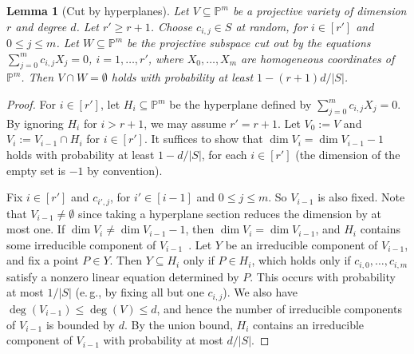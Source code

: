 \documentclass[11pt]{article}
\numberwithin{equation}{section}
\newtheorem{lemma}[theorem]{Lemma}
\theoremstyle{definition}
\theoremstyle{plain}
\newcommand{\eg}{e.\,g.}
\newcommand{\proj}{\mathbb{P}}
\begin{document}
\begin{lemma}[Cut by hyperplanes]\label{lem_hyperplane}
Let $V\subseteq\proj^m$ be a projective variety of dimension $r$ and degree $d$. Let $r'\geq r+1$. Choose $c_{i,j}\in S$ at random, for $i\in [r']$ and $0\leq j\leq m$.
Let $W\subseteq \proj^m$ be the projective subspace cut out by the equations $\sum_{j=0}^{m} c_{i,j} X_j=0$, $i=1,\dots,r'$, where $X_0,\dots,X_m$ are homogeneous coordinates of $\proj^m$. Then $V\cap W=\emptyset$ holds with probability at least $1-(r+1)d/|S|$.
\end{lemma}
\begin{proof}
For $i\in [r']$, let $H_i\subseteq \proj^m$ be the hyperplane defined by $\sum_{j=0}^{m} c_{i,j} X_j=0$. By ignoring $H_i$ for $i>r+1$, we may assume $r'=r+1$.  Let $V_0:= V$ and $V_i:= V_{i-1}\cap H_i$ for $i\in [r']$. It suffices to show that $\dim V_i=\dim V_{i-1}-1$ holds with probability at least $1-d/|S|$, for each $i\in [r']$ (the dimension of the empty set is $-1$ by convention). 

Fix $i\in [r']$ and $c_{i',j}$, for $i'\in [i-1]$ and $0\leq j\leq m$. So $V_{i-1}$ is also fixed.  Note that $V_{i-1}\neq \emptyset$ since  taking a hyperplane section reduces the dimension  by at most one. If $\dim V_i\neq \dim V_{i-1}-1$, then $\dim V_i=\dim V_{i-1}$, and $H_i$ contains some irreducible component of $V_{i-1}$~\cite[Exercise~11.6]{Har92}. Let $Y$ be an irreducible component of $V_{i-1}$, and fix a point $P\in Y$. Then $Y\subseteq H_i$ only if $P\in H_i$, which holds only if  $c_{i,0},\dots,c_{i,m}$ satisfy a nonzero linear equation determined by $P$. This occurs with probability at most $1/|S|$ (\eg, by fixing all but one $c_{i,j}$). 
We also have $\deg(V_{i-1})\leq \deg(V)\leq d$, and hence the number of irreducible components of $V_{i-1}$ is bounded by $d$.
By the union bound, $H_i$ contains an irreducible component of $V_{i-1}$ with probability at most $d/|S|$.
\end{proof}
%
%
\end{document}
